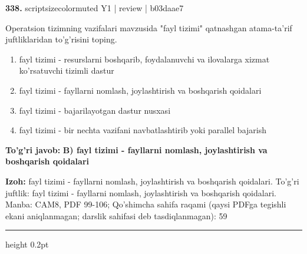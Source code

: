 \documentclass[10pt,a4paper]{article}
\begin{document}
{\bfseries\sffamily\color{ink} 338.} {scriptsizecolor{muted} Y1 | review | b03daae7}
\par
Operatsion tizimning vazifalari mavzusida "fayl tizimi" qatnashgan atama-ta'rif juftliklaridan to'g'risini toping.
\begin{enumerate}[label=\Alph*),leftmargin=9mm]
\item fayl tizimi - resurslarni boshqarib, foydalanuvchi va ilovalarga xizmat ko'rsatuvchi tizimli dastur
\item fayl tizimi - fayllarni nomlash, joylashtirish va boshqarish qoidalari
\item fayl tizimi - bajarilayotgan dastur nusxasi
\item fayl tizimi - bir nechta vazifani navbatlashtirib yoki parallel bajarish
\end{enumerate}
\begin{tcolorbox}[enhanced,breakable,colback=teal!4,colframe=teal!60!black,boxrule=0.45pt,arc=1.2mm,left=2.7mm,right=2.7mm,top=1.8mm,bottom=1.8mm,before skip=2mm,after skip=2mm]
{\bfseries\sffamily\color{teal}To'g'ri javob:} \textbf{B) fayl tizimi - fayllarni nomlash, joylashtirish va boshqarish qoidalari}
\par\smallskip
{\bfseries Izoh:} fayl tizimi - fayllarni nomlash, joylashtirish va boshqarish qoidalari. To'g'ri juftlik: fayl tizimi - fayllarni nomlash, joylashtirish va boshqarish qoidalari. Manba: CAM8, PDF 99-106; Qo'shimcha sahifa raqami (qaysi PDFga tegishli ekani aniqlanmagan; darslik sahifasi deb tasdiqlanmagan): 59
\end{tcolorbox}
\vspace{2mm}\hrule height 0.2pt\vspace{3mm}
\end{document}

